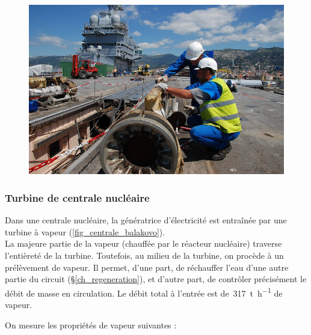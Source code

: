 	\begin{figure}[htc]
		\begin{center}
			\onlyframabook{\vspace{-0.6cm}}%
			\includegraphics[width=\columnwidth]{images/catapulte_vapeur_2.jpg}
			\onlyframabook{\\\vspace{-0.6cm}}%
		\end{center}
		\label{fig_exo_catapulte_2}
	\end{figure}


\subsubsection{Turbine de centrale nucléaire}
\label{exo_turbine_balakovo}

	Dans une centrale nucléaire, la génératrice d’électricité est entraînée par une turbine à vapeur (\cref{fig_centrale_balakovo}).\\
	La majeure partie de la vapeur (chauffée par le réacteur nucléaire) traverse l’entièreté de la turbine. Toutefois, au milieu de la turbine, on procède à un prélèvement de vapeur. Il permet, d’une part, de réchauffer l’eau d’une autre partie du circuit (\S\ref{ch_regeneration}), et d’autre part, de contrôler précisément le débit de masse en circulation. Le débit total à l’entrée est de~\SI{317}{\tonne\per\hour} de vapeur.
	
	On mesure les propriétés de vapeur suivantes :
	
